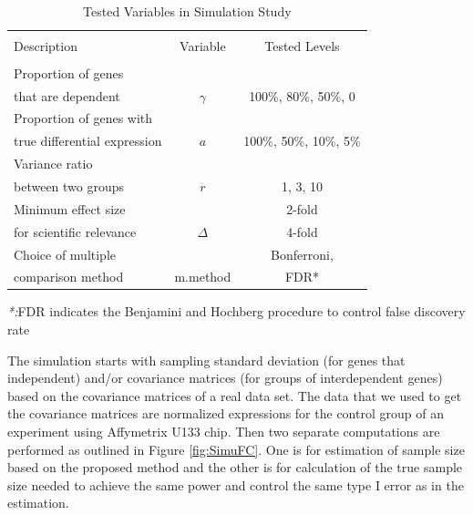 \documentclass{bioinfo}
\begin{document}
\begin{table}[h]\centering
\caption{Tested Variables in Simulation Study}\ \\
\begin{tabular}{lcc}
  \hline\hline
  \\
  Description & Variable & Tested Levels \\
  \\
  \hline\hline
  Proportion of genes & & \\
  that are dependent & $\gamma$ & 100\%, 80\%, 50\%, 0\\
  \hline
  Proportion of genes with & & \\
  true differential expression & $a$ & 100\%, 50\%,
  10\%, 5\% \\
  \hline
  Variance ratio &  &\\
  between two groups & $r$ & 1, 3, 10  \\
  \hline
  Minimum effect size  & &2-fold \\
  for scientific relevance & $\Delta$ & 4-fold \\
  \hline
  Choice of multiple  & & Bonferroni,  \\
  comparison method & m.method & FDR* \\
  \hline\hline
\end{tabular}
\emph{*:}FDR indicates the Benjamini and Hochberg procedure to control false discovery rate \label{tb:SimuVariables}
\end{table}

The simulation starts with sampling standard deviation (for genes
that independent) and/or covariance matrices (for groups of
interdependent genes) based on the covariance matrices of a real
data set. The data that we used to get the covariance matrices are
normalized expressions for the control group of an experiment
using Affymetrix U133 chip. Then two separate computations are
performed as outlined in Figure \ref{fig:SimuFC}. One is for
estimation of sample size based on the proposed method and the
other is for calculation of the true sample size needed to achieve
the same power and control the same type I error as in the
estimation.
\end{document}
